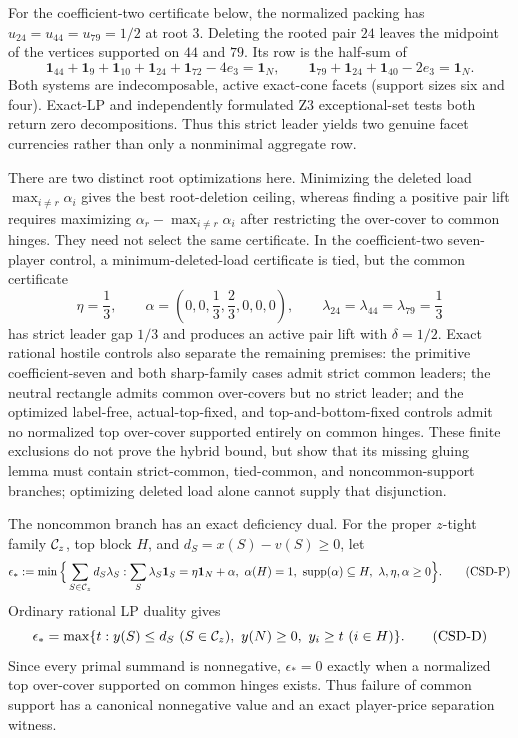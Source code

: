 \documentclass[11pt]{article}
\begin{document}
For the coefficient-two certificate below, the normalized packing has
$u_{24}=u_{44}=u_{79}=1/2$ at root $3$.  Deleting the rooted pair $24$ leaves
the midpoint of the vertices supported on $44$ and $79$.  Its row is the
half-sum of
\[
 \mathbf1_{44}+\mathbf1_9+\mathbf1_{10}+\mathbf1_{24}
 +\mathbf1_{72}-4e_3=\mathbf1_N,
 \qquad
 \mathbf1_{79}+\mathbf1_{24}+\mathbf1_{40}-2e_3=\mathbf1_N.
\]
Both systems are indecomposable, active exact-cone facets (support sizes six
and four).  Exact-LP and independently formulated Z3 exceptional-set tests
both return zero decompositions.  Thus this strict leader yields two genuine
facet currencies rather than only a nonminimal aggregate row.

There are two distinct root optimizations here.  Minimizing the deleted load
$\max_{i\ne r}\alpha_i$ gives the best root-deletion ceiling, whereas finding
a positive pair lift requires maximizing
$\alpha_r-\max_{i\ne r}\alpha_i$ after restricting the over-cover to common
hinges.  They need not select the same certificate.  In the coefficient-two
seven-player control, a minimum-deleted-load certificate is tied, but the
common certificate
\[
 \eta=\frac13,\qquad
 \alpha=(0,0,\frac13,\frac23,0,0,0),\qquad
 \lambda_{24}=\lambda_{44}=\lambda_{79}=\frac13
\]
has strict leader gap $1/3$ and produces an active pair lift with
$\delta=1/2$.  Exact rational hostile controls also separate the remaining
premises: the primitive coefficient-seven and both sharp-family cases admit
strict common leaders; the neutral rectangle admits common over-covers but
no strict leader; and the optimized label-free, actual-top-fixed, and
top-and-bottom-fixed controls admit no normalized top over-cover supported
entirely on common hinges.  These finite exclusions do not prove the hybrid
bound, but show that its missing gluing lemma must contain strict-common,
tied-common, and noncommon-support branches; optimizing deleted load alone
cannot supply that disjunction.

The noncommon branch has an exact deficiency dual.  For the proper
$z$-tight family ${\cal C}_z$, top block $H$, and
$d_S=x(S)-v(S)\ge0$, let
\[
 \epsilon_*:=\min\Big\{\sum_{S\in{\cal C}_z}d_S\lambda_S:
 \sum_S\lambda_S\mathbf1_S=\eta\mathbf1_N+\alpha,
 \ \alpha(H)=1,\ {\rm supp}(\alpha)\subseteq H,
 \ \lambda,\eta,\alpha\ge0\Big\}.                    \tag{CSD-P}
\]
Ordinary rational LP duality gives
\[
 \epsilon_*=\max\{t:y(S)\le d_S\ (S\in{\cal C}_z),\
 y(N)\ge0,\ y_i\ge t\ (i\in H)\}.                    \tag{CSD-D}
\]
Since every primal summand is nonnegative, $\epsilon_*=0$ exactly when a
normalized top over-cover supported on common hinges exists.  Thus failure of
common support has a canonical nonnegative value and an exact player-price
separation witness.
\end{document}
